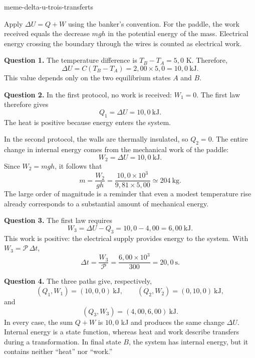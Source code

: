 \begin{exo}{meme-delta-u-trois-transferts}
\begin{indication}
Apply $\Delta U=Q+W$ using the banker's convention. For the paddle, the work
received equals the decrease $mgh$ in the potential energy of the mass.
Electrical energy crossing the boundary through the wires is counted as
electrical work.
\end{indication}

\begin{solution}
\textbf{Question 1.} The temperature difference is $T_B-T_A=5{,}0$ K.
Therefore,
\[
\Delta U=C(T_B-T_A)
=2{,}00\times5{,}0
=10{,}0\ \mathrm{kJ}.
\]
This value depends only on the two equilibrium states $A$ and $B$.

\textbf{Question 2.} In the first protocol, no work is received: $W_1=0$.
The first law therefore gives
\[
Q_1=\Delta U=10{,}0\ \mathrm{kJ}.
\]
The heat is positive because energy enters the system.

In the second protocol, the walls are thermally insulated, so $Q_2=0$.
The entire change in internal energy comes from the mechanical work of the
paddle:
\[
W_2=\Delta U=10{,}0\ \mathrm{kJ}.
\]
Since $W_2=mgh$, it follows that
\[
m=\frac{W_2}{gh}
=\frac{10{,}0\times10^3}{9{,}81\times5{,}00}
\simeq 204\ \mathrm{kg}.
\]
The large order of magnitude is a reminder that even a modest temperature
rise already corresponds to a substantial amount of mechanical energy.

\textbf{Question 3.} The first law requires
\[
W_3=\Delta U-Q_3=10{,}0-4{,}00=6{,}00\ \mathrm{kJ}.
\]
This work is positive: the electrical supply provides energy to the system.
With $W_3=\mathcal P\,\Delta t$,
\[
\Delta t=\frac{W_3}{\mathcal P}
=\frac{6{,}00\times10^3}{300}
=20{,}0\ \mathrm{s}.
\]

\textbf{Question 4.} The three paths give, respectively,
\[
(Q_1,W_1)=(10{,}0,0)\ \mathrm{kJ},
\qquad
(Q_2,W_2)=(0,10{,}0)\ \mathrm{kJ},
\]
and
\[
(Q_3,W_3)=(4{,}00,6{,}00)\ \mathrm{kJ}.
\]
In every case, the sum $Q+W$ is $10{,}0$ kJ and produces the same change
$\Delta U$. Internal energy is a state function, whereas heat and work
describe transfers during a transformation. In final state $B$, the system
has internal energy, but it contains neither ``heat'' nor ``work.''
\end{solution}
\end{exo}

